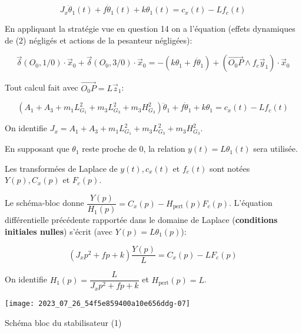 $$
J_{x} \ddot{\theta}_{1}(t)+f \dot{\theta}_{1}(t)+k \theta_{1}(t)=c_{x}(t)-L f_{c}(t)
$$
\ifprof
\begin{corrige}
En appliquant la stratégie vue en question 14 on a l'équation (effets dynamiques de (2) négligés et actions de la pesanteur négligées):

$$ \overrightarrow{\delta}(O_0,1/0)\cdot \overrightarrow{x}_0 + \overrightarrow{\delta}(O_0,3/0)\cdot \overrightarrow{x}_0 = -(k\theta_1 + f \dot{\theta}_1) + \left( \overrightarrow{O_0 P} \wedge f_c \overrightarrow{y}_1 \right)\cdot \overrightarrow{x}_0 $$ 

Tout calcul fait avec $\overrightarrow{O_0 P} = L \overrightarrow{z}_1$:

$$ \boxed{ \left( A_1 + A_3 + m_1 L_{G_1}^2 + m_3 L_{G_3}^2 + m_3 H_{G_3}^2 \right)\ddot{\theta}_1 + f \dot{\theta}_1 + k\theta_1 = c_x(t) -L f_c(t)} $$

On identifie $\boxed{J_x = A_1 + A_3 + m_1 L_{G_1}^2 + m_3 L_{G_3}^2 + m_3 H_{G_3}^2}$.

\end{corrige}
\else
\fi

En supposant que $\theta_{1}$ reste proche de 0, la relation $y(t)=L \theta_{1}(t)$ sera utilisée.

Les transformées de Laplace de $y(t), c_{x}(t)$ et $f_{c}(t)$ sont notées $Y(p), C_{x}(p)$ et $F_{c}(p)$.

\ifprof
\begin{corrige}
Le schéma-bloc donne $\dfrac{Y(p)}{H_1(p)} = C_x(p) - H_{\text{pert}}(p)F_c(p)$. L'équation différentielle précédente rapportée dans le domaine de Laplace (\textbf{conditions initiales nulles}) s'écrit (avec $Y(p) = L \theta_1(p)$):

$$ \left( J_x p^2 + f p + k \right)\dfrac{Y(p)}{L} = C_x(p) - L F_c(p) $$

On identifie $\boxed{H_1(p) = \dfrac{L}{J_x p^2 + f p + k}}$ et $\boxed{H_{\text{pert}}(p) = L}$.
\end{corrige}
\else
\fi


\begin{marginfigure}
\texttt{[image: 2023\_07\_26\_54f5e859400a10e656ddg-07]}
\caption{\label{fig:10}Schéma bloc du stabilisateur (1)}
\end{marginfigure}

